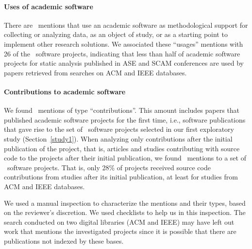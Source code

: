 \paragraph{\bf Uses of academic software}
There are  \UseCount \ mentions that use an academic software 
as methodological support for collecting or analyzing data, 
as an object of study, or as a starting point to implement other research solutions.
%
We associated these ``usages'' mentions with 26 of the
\SoftwareCount \ software projects, 
indicating that less than half of academic
software projects for static analysis published in ASE and SCAM conferences 
are used by papers  retrieved from searches on ACM and IEEE databases.

\paragraph{\bf Contributions to academic software}
We found \ContributeCount \ mentions of type ``contributions''. 
This amount includes papers  that published academic software projects 
for the first time, i.e., software publications
that gave rise to the set of \SoftwareCount \ software
projects selected in our first exploratory study (Section~\ref{study1}).
%
When analyzing only contributions after the initial publication of the project,
that is, articles and studies contributing with source code to the projects
after their initial publication, we found \ContributeStudyDoisCount \ mentions
to a set of \ContributeStudyDoisSoftware \ software projects. 
That is, only 28\% of projects received source code contributions 
from studies after its initial publication, 
at least for studies from ACM and IEEE databases.

%
We used a manual inspection to characterize the
mentions and their types, based on the reviewer's discretion. We used checklists
to help us in this inspection. The search conducted on two digital libraries
(ACM and IEEE)  may have left out work that mentions the investigated projects
since it is possible that there are publications not indexed by these bases.
